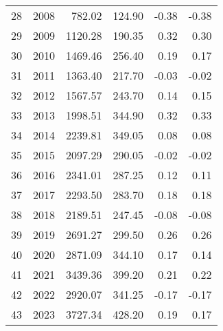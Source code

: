\begin{tabular}{lrrrrr}
28 & 2008 & 782.02 & 124.90 & -0.38 & -0.38 \\
29 & 2009 & 1120.28 & 190.35 & 0.32 & 0.30 \\
30 & 2010 & 1469.46 & 256.40 & 0.19 & 0.17 \\
31 & 2011 & 1363.40 & 217.70 & -0.03 & -0.02 \\
32 & 2012 & 1567.57 & 243.70 & 0.14 & 0.15 \\
33 & 2013 & 1998.51 & 344.90 & 0.32 & 0.33 \\
34 & 2014 & 2239.81 & 349.05 & 0.08 & 0.08 \\
35 & 2015 & 2097.29 & 290.05 & -0.02 & -0.02 \\
36 & 2016 & 2341.01 & 287.25 & 0.12 & 0.11 \\
37 & 2017 & 2293.50 & 283.70 & 0.18 & 0.18 \\
38 & 2018 & 2189.51 & 247.45 & -0.08 & -0.08 \\
39 & 2019 & 2691.27 & 299.50 & 0.26 & 0.26 \\
40 & 2020 & 2871.09 & 344.10 & 0.17 & 0.14 \\
41 & 2021 & 3439.36 & 399.20 & 0.21 & 0.22 \\
42 & 2022 & 2920.07 & 341.25 & -0.17 & -0.17 \\
43 & 2023 & 3727.34 & 428.20 & 0.19 & 0.17 \\
\bottomrule
\end{tabular}
